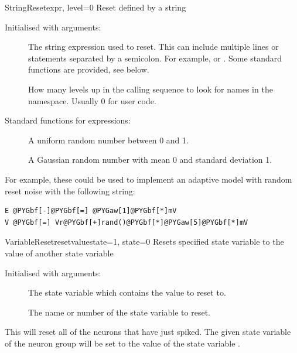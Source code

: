 \documentclass[letterpaper,10pt,english]{manual}
\begin{document}
\hypertarget{brian.StringReset}{}\begin{classdesc}{StringReset}{expr, level=0}
Reset defined by a string

Initialised with arguments:
\begin{description}
\item[]
The string expression used to reset. This can include 
multiple lines or statements separated by a semicolon.
For example,  or .
Some standard functions are provided, see below.

\item[]
How many levels up in the calling sequence to look for
names in the namespace. Usually 0 for user code.

\end{description}

Standard functions for expressions:
\begin{description}
\item[]
A uniform random number between 0 and 1.

\item[]
A Gaussian random number with mean 0 and standard deviation 1.

\end{description}

For example, these could be used to implement an adaptive
model with random reset noise with the following string:

\begin{Verbatim}[commandchars=@\[\]]
E @PYGbf[-]@PYGbf[=] @PYGaw[1]@PYGbf[*]mV
V @PYGbf[=] Vr@PYGbf[+]rand()@PYGbf[*]@PYGaw[5]@PYGbf[*]mV
\end{Verbatim}
\end{classdesc}

\hypertarget{brian.VariableReset}{}\begin{classdesc}{VariableReset}{resetvaluestate=1, state=0}
Resets specified state variable to the value of another state variable

Initialised with arguments:
\begin{description}
\item[]
The state variable which contains the value to reset to.

\item[]
The name or number of the state variable to reset.

\end{description}

This will reset all of the neurons that have just spiked. The
given state variable of the neuron group will be set to
the value of the state variable .
\end{classdesc}
\end{document}
